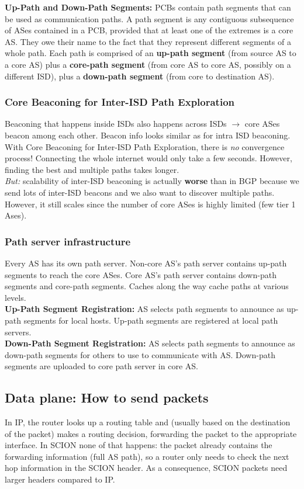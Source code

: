 \textbf{Up-Path and Down-Path Segments:} PCBs contain path segments that
can be used as communication paths. A path segment is any contiguous subsequence of ASes contained in a PCB, provided that at least one of the extremes is a core AS. They owe their name to the fact that they represent different segments of a whole path. Each path is comprised of an \textbf{up-path segment} (from source AS to a core AS) plus a \textbf{core-path segment} (from core AS to core AS, possibly on a different ISD), plus a \textbf{down-path segment} (from core to destination AS).\\

\subsubsection{Core Beaconing for Inter-ISD Path Exploration}
Beaconing that happens inside ISDs also happens across ISDs $\rightarrow$ core ASes beacon among each other. Beacon info looks similar as for intra ISD beaconing. With Core Beaconing for Inter-ISD Path Exploration, there is \textit{no} convergence process! Connecting the whole internet would only take a few seconds. However, finding the best and multiple paths takes longer.\\
\textit{But:} scalability of inter-ISD beaconing is actually \textbf{worse} than in BGP because we send lots of inter-ISD beacons and we also want to discover multiple paths. However, it still scales since the number of core ASes is highly limited (few tier 1 Ases).

\subsubsection{Path server infrastructure}
Every AS has its own path server. Non-core AS's path server contains up-path segments to reach the core ASes. Core AS's path server contains down-path segments and core-path segments. Caches along the way cache paths at various levels.\\
\textbf{Up-Path Segment Registration:} AS selects path segments to announce
as up-path segments for local hosts. Up-path segments are registered at local path servers.\\
\textbf{Down-Path Segment Registration:} AS selects path segments to announce as down-path segments for others to use to communicate with AS. Down-path segments are uploaded to core path server in core AS.

\subsection{Data plane: How to send packets}
In IP, the router looks up a routing table and (usually based on the destination of the packet) makes a routing decision, forwarding the packet to the appropriate interface. In SCION none of that happens: the packet already contains the forwarding information (full AS path), so a router only needs to check the next hop information in the SCION header. As a consequence, SCION packets need larger headers compared to IP.

